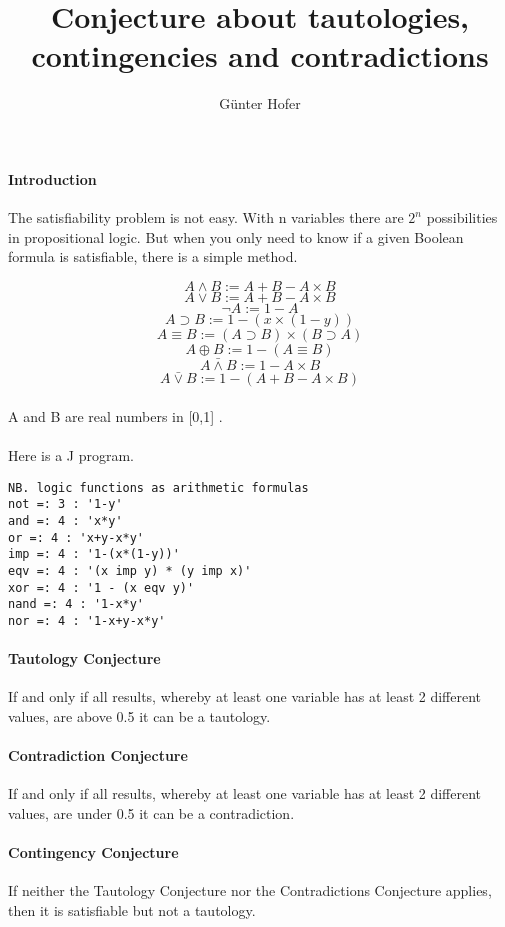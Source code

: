 \documentclass[12pt,a4paper]{article}
\begin{document}
\title{Conjecture about tautologies, contingencies
and contradictions}
\author{Günter Hofer}
\maketitle
\newpage 
\paragraph{Introduction}
The satisfiability problem is not easy. With n variables there are $2^n$ possibilities in propositional logic. But when you only need to know if a given Boolean formula
is satisfiable, there is a simple method.


\[A \land B := A + B - A \times B\]
\[A \lor B 		:= A + B - A \times B\]
\[\lnot A := 1 - A\]
\[A \supset B := 1 - (x \times (1 - y))\]
\[A \equiv B := (A \supset B) \times (B \supset A) \]
\[A \oplus B := 1 - (A \equiv B)\]
\[A \bar{\land} B := 1- A \times B\]
\[A \bar{\lor}B := 1 - (A + B - A \times B)\]
\paragraph{}
A and B are real numbers in [0,1] .
\paragraph{}
Here is a J program.
\begin{verbatim}
NB. logic functions as arithmetic formulas
not =: 3 : '1-y'
and =: 4 : 'x*y'
or =: 4 : 'x+y-x*y'
imp =: 4 : '1-(x*(1-y))'
eqv =: 4 : '(x imp y) * (y imp x)'
xor =: 4 : '1 - (x eqv y)'
nand =: 4 : '1-x*y'
nor =: 4 : '1-x+y-x*y'
\end{verbatim}

\paragraph{Tautology Conjecture}
If and only if all results, whereby at least one variable has at least 2 different values, are above 0.5 it can be a tautology.

\paragraph{Contradiction Conjecture}
If and only if all results, whereby at least one variable has at least 2 different values, are under 0.5 it can be a contradiction.

\paragraph{Contingency Conjecture}
If neither the Tautology Conjecture nor the Contradictions Conjecture applies, then it is satisfiable but not a tautology.
\newpage 
\end{document}
